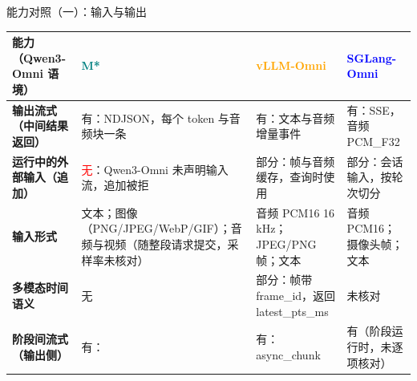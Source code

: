 
\begin{frame}[t]{能力对照（一）：输入与输出}
\scriptsize
\renewcommand{\arraystretch}{1.12}
\setlength{\tabcolsep}{3pt}
\begin{tabularx}{\textwidth}{>{\bfseries}p{2.9cm} Y Y Y}
\toprule
{}
能力（Qwen3-Omni 语境） & \textcolor{Teal}{M*} & \textcolor{Orange}{vLLM-Omni} & \textcolor{Blue}{SGLang-Omni} \\
\midrule
输出流式（中间结果返回） & 有：NDJSON，每个 token 与音频块一条 & 有：文本与音频增量事件 & 有：SSE，音频 PCM\_F32 \\
运行中的外部输入（追加） & \textcolor{Red}{无}：Qwen3-Omni 未声明输入流，追加被拒 & 部分：帧与音频缓存，查询时使用 & 部分：会话输入，按轮次切分 \\
输入形式 & 文本；图像（PNG/JPEG/WebP/GIF）；音频与视频（随整段请求提交，采样率未核对） & 音频 PCM16 16 kHz；JPEG/PNG 帧；文本 & 音频 PCM16；摄像头帧；文本 \\
多模态时间语义 & 无 & 部分：帧带 frame\_id，返回 latest\_pts\_ms & 未核对 \\
阶段间流式（输出侧） & 有： & 有：async\_chunk & 有（阶段运行时，未逐项核对） \\
\bottomrule
\end{tabularx}
\par{}
\par{}
\end{frame}

